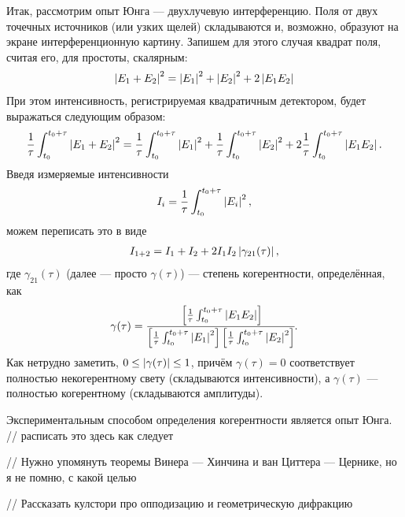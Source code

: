 Итак, рассмотрим опыт Юнга --- двухлучевую интерференцию. Поля от двух
точечных источников (или узких щелей) складываются и, возможно, образуют на
экране интерференционную картину. Запишем для этого случая квадрат поля, считая
его, для простоты, скалярным:
\begin{align*}
  \left\lvert E_1 + E_2 \right\rvert^2 = \left\lvert E_1 \right\rvert^2 + \left\lvert E_2 \right\rvert^2 + 2\left\lvert E_1E_2 \right\rvert
\end{align*}
При этом интенсивность, регистрируемая
квадратичным детектором, будет выражаться следующим образом:
\begin{align*}
  \frac{1}{\tau}\int_{t_0}^{t_0 + \tau} \left\lvert E_1 + E_2 \right\rvert^2 
  = \frac{1}{\tau}\int_{t_0}^{t_0 + \tau} \left\lvert E_1 \right\rvert^2 
  + \frac{1}{\tau}\int_{t_0}^{t_0 + \tau} \left\lvert E_2 \right\rvert^2 
  + 2\frac{1}{\tau}\int_{t_0}^{t_0 + \tau} \left\lvert E_1E_2 \right\rvert.
\end{align*}
Введя измеряемые интенсивности
\begin{align*}
  I_i = \frac{1}{\tau}\int_{t_0}^{t_0 + \tau} \left\lvert E_i \right\rvert^2,
\end{align*}
можем переписать это в виде
\begin{align*}
  I_{1+2} = I_1 + I_2 + 2I_1I_2\left\lvert \gamma_{21}(\tau) \right\rvert,
\end{align*}
где \(\gamma_{21}(\tau)\) (далее --- просто \(\gamma(\tau)\)) --- степень
когерентности, определённая, как
\begin{align*}
  \gamma(\tau) = \cfrac{
  \left[\frac{1}{\tau}\int_{t_0}^{t_0 + \tau} \left\lvert E_1E_2 \right\rvert\right]
  }{
  \left[\frac{1}{\tau}\int_{t_0}^{t_0 + \tau} \left\lvert E_1 \right\rvert^2\right]
  \left[\frac{1}{\tau}\int_{t_0}^{t_0 + \tau} \left\lvert E_2 \right\rvert^2\right] 
  }.
\end{align*}
Как нетрудно заметить, \(0 \le \left\lvert \gamma(\tau) \right\rvert \le 1\), причём
\(\gamma(\tau) = 0\) соответствует полностью некогерентному свету (складываются
интенсивности), а \(\gamma(\tau)\) --- полностью когерентному (складываются
амплитуды).

Экспериментальным способом определения когерентности является опыт Юнга.
// расписать это здесь как следует

// Нужно упомянуть теоремы Винера --- Хинчина и ван Циттера --- Цернике, но я не
помню, с какой целью

// Рассказать кулстори про опподизацию и геометрическую дифракцию




